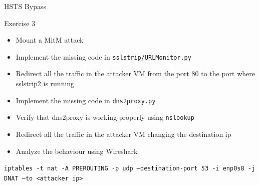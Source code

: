\documentclass{beamer}
\begin{document}
\begin{frame}{HSTS Bypass}
  \begin{block}{Exercise 3}
  \begin{itemize}
      \item Mount a MitM attack
      \item Implement the missing code in \texttt{sslstrip/URLMonitor.py}
      \item Redirect all the traffic in the attacker VM from the port 80 to the port where sslstrip2 is running
      \item Implement the missing code in \texttt{dns2proxy.py}
      \item Verify that dns2proxy is working properly using \texttt{nslookup}
      \item Redirect all the traffic in the attacker VM changing the destination ip
      \item Analyze the behaviour using Wireshark
  \end{itemize}
  \end{block}
  \pause
  \texttt{iptables -t nat -A PREROUTING -p udp --destination-port 53 -i enp0s8 -j DNAT --to <attacker ip>}
\end{frame}
\end{document}
